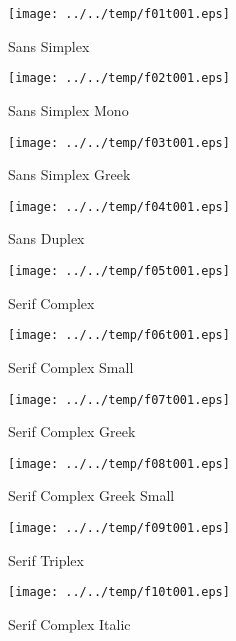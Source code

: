 \documentclass[a4paper,twoside,11pt]{article}
\makeatletter
\def\maxwidth{%
  \ifdim\Gin@nat@width>\linewidth
    \linewidth
  \else
    \Gin@nat@width
  \fi
}
\makeatother
\begin{document}
\clearpage
\begin{figure}
  \centering
  \texttt{[image: ../../temp/f01t001.eps]}
  \caption{Sans Simplex}
  \label{fig:f01t001}
\end{figure}

\begin{figure}
  \centering
  \texttt{[image: ../../temp/f02t001.eps]}
  \caption{Sans Simplex Mono}
  \label{fig:f02t001}
\end{figure}

\clearpage
\begin{figure}
  \centering
  \texttt{[image: ../../temp/f03t001.eps]}
  \caption{Sans Simplex Greek}
  \label{fig:f03t001}
\end{figure}

\begin{figure}
  \centering
  \texttt{[image: ../../temp/f04t001.eps]}
  \caption{Sans Duplex}
  \label{fig:f04t001}
\end{figure}

\clearpage
\begin{figure}
  \centering
  \texttt{[image: ../../temp/f05t001.eps]}
  \caption{Serif Complex}
  \label{fig:f05t001}
\end{figure}

\begin{figure}
  \centering
  \texttt{[image: ../../temp/f06t001.eps]}
  \caption{Serif Complex Small}
  \label{fig:f06t001}
\end{figure}

\clearpage
\begin{figure}
  \centering
  \texttt{[image: ../../temp/f07t001.eps]}
  \caption{Serif Complex Greek}
  \label{fig:f07t001}
\end{figure}

\begin{figure}
  \centering
  \texttt{[image: ../../temp/f08t001.eps]}
  \caption{Serif Complex Greek Small}
  \label{fig:f08t001}
\end{figure}

\clearpage
\begin{figure}
  \centering
  \texttt{[image: ../../temp/f09t001.eps]}
  \caption{Serif Triplex}
  \label{fig:f09t001}
\end{figure}

\begin{figure}
  \centering
  \texttt{[image: ../../temp/f10t001.eps]}
  \caption{Serif Complex Italic}
  \label{fig:f10t001}
\end{figure}
\end{document}

